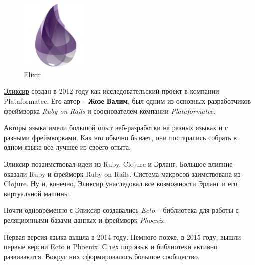 \begin{figure}[h]
  \centering
  \includegraphics[width=0.3\textwidth]{./lesson_02/img/elixir_logo.png}
  \caption{Elixir}
\end{figure}

\href{https://elixir-lang.org/}{Эликсир} создан в 2012 году как исследовательский проект в компании Plataformatec. Его автор -- \textbf{Жозе Валим}, был одним из основных разработчиков фреймворка \textit{Ruby on Rails} и сооснователем компании \textit{Plataformatec}.

Авторы языка имели большой опыт веб-разработки на разных языках и с разными фреймворками. Как это обычно бывает, они постарались собрать в одном языке все лучшее из своего опыта.

Эликсир позаимствовал идеи из Ruby, Clojure и Эрланг. Большое влияние оказали Ruby и фрейморк Ruby on Rails. Система макросов заимствована из Clojure. Ну и, конечно, Эликсир унаследовал все возможности Эрланг и его виртуальной машины.

Почти одновременно с Эликсир создавались \textit{Ecto} -- библиотека для работы с реляционными базами данных и фреймворк \textit{Phoenix}.

Первая версия языка вышла в 2014 году. Немного позже, в 2015 году, вышли первые версии Ecto и Phoenix. С тех пор язык и библиотеки активно развиваются. Вокруг них сформировалось большое сообщество.
